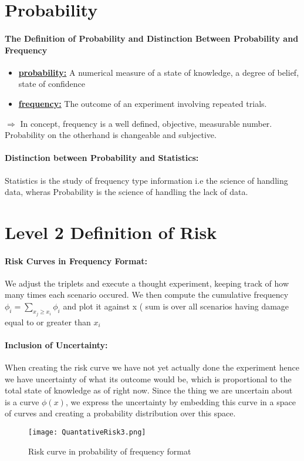 \documentclass[8pt]{extreport}
\begin{document}
{{\section{\large{Probability}}
\paragraph{The Definition of Probability and Distinction Between Probability and Frequency}
\begin{itemize}
\item \underline{ \textbf{probability:}} A numerical measure of a state of knowledge, a degree of belief, state of confidence
\item \underline{ \textbf{frequency:}} The outcome of an experiment involving repeated trials.
\end{itemize}
$\Rightarrow$ \small{In concept, frequency is a well defined, objective, measurable number. Probability on the otherhand is changeable and subjective.}
\paragraph{Distinction between Probability and Statistics:} \small{Statistics is the study of frequency type information i.e the science of handling data, wheras Probability is the science of handling the lack of data.}
\section{\large{Level 2 Definition of Risk}}
\paragraph{Risk Curves in Frequency Format:} \small{We adjust the triplets and execute a thought experiment, keeping track of how many times each scenario occured. We then compute the cumulative frequency $\phi_i = \displaystyle\sum_{x_j \geq x_i} \phi_i$ and plot it against x ( sum is over all scenarios having damage equal to or greater than $x_i$}
\paragraph{Inclusion of Uncertainty:} \small{When creating the risk curve we have not yet actually done the experiment  hence we have uncertainty of what its outcome would be, which is proportional to the total state of knowledge as of right now. Since the thing we are uncertain about is a curve $\phi(x)$, we express the uncertainty by embedding this curve in a space of curves and creating a probability distribution over this space.}
\begin{figure}[h!]
  \centering\texttt{[image: QuantativeRisk3.png]}
  \caption{\footnotesize{Risk curve in probability of frequency format}}
  \label{scenarioList}
\end{figure}
}}
\end{document}
